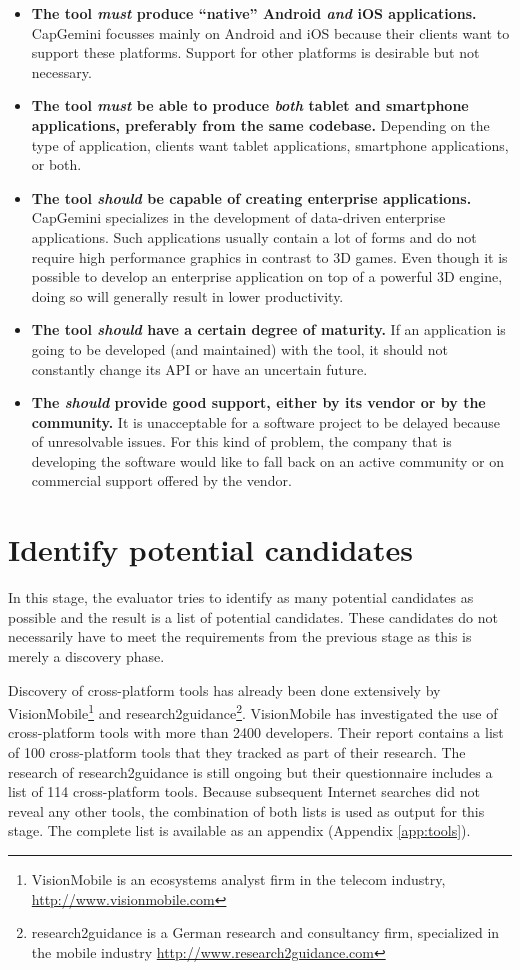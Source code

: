 \begin{itemize}
    \item \textbf{The tool \emph{must} produce ``native'' Android \emph{and} iOS applications.} CapGemini focusses mainly on Android and iOS because their clients want to support these platforms. Support for other platforms is desirable but not necessary.
    \item \textbf{The tool \emph{must} be able to produce \emph{both} tablet and smartphone applications, preferably from the same codebase.} Depending on the type of application, clients want tablet applications, smartphone applications, or both.
    \item \textbf{The tool \emph{should} be capable of creating enterprise applications.} CapGemini specializes in the development of data-driven enterprise applications. Such applications usually contain a lot of forms and do not require high performance graphics in contrast to 3D games. Even though it is possible to develop an enterprise application on top of a powerful 3D engine, doing so will generally result in lower productivity.
    \item \textbf{The tool \emph{should} have a certain degree of maturity.} If an application is going to be developed (and maintained) with the tool, it should not constantly change its API or have an uncertain future. 
    \item \textbf{The \emph{should} provide good support, either by its vendor or by the community.} It is unacceptable for a software project to be delayed because of unresolvable issues. For this kind of problem, the company that is developing the software would like to fall back on an active community or on commercial support offered by the vendor.
\end{itemize}

\section{Identify potential candidates}

In this stage, the evaluator tries to identify as many potential candidates as possible and the result is a list of potential candidates. These candidates do not necessarily have to meet the requirements from the previous stage as this is merely a discovery phase.

Discovery of cross-platform tools has already been done extensively by VisionMobile\footnote{VisionMobile is an ecosystems analyst firm in the telecom industry, \url{http://www.visionmobile.com}} \cite{VMCPT:2012} and \mbox{research2guidance}\footnote{research2guidance is a German research and consultancy firm, specialized in the mobile industry \url{http://www.research2guidance.com}}. VisionMobile has investigated the use of cross-platform tools with more than 2400 developers. Their report contains a list of 100 cross-platform tools that they tracked as part of their research. The research of \mbox{research2guidance} is still ongoing but their questionnaire includes a list of 114 cross-platform tools. Because subsequent Internet searches did not reveal any other tools, the combination of both lists is used as output for this stage. The complete list is available as an appendix (Appendix \ref{app:tools}).


